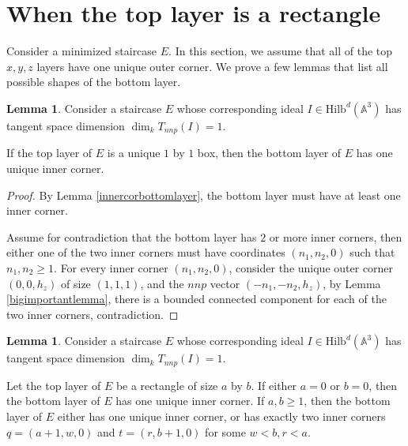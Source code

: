\documentclass{amsart}[10pt]
\theoremstyle{plain}
\theoremstyle{definition}
\newtheorem{lemma}[theorem]{Lemma}
\newcommand{\Hilb}{\mathrm{Hilb}}
\begin{document}
\section{When the top layer is a rectangle}

Consider a minimized staircase $E$. In this section, we assume that all of the top $x,y,z$ layers have one unique outer corner. We prove a few lemmas that list all possible shapes of the bottom layer.


\begin{lemma}
Consider a staircase $E$ whose corresponding ideal $I \in \Hilb^d(\mathbb{A}^3)$ has tangent space dimension $\dim_k T_{nnp}(I)=1$. 

If the top layer of $E$ is a unique $1$ by $1$ box, then the bottom layer of $E$ has one unique inner corner.
\end{lemma}

\begin{proof}
By Lemma \ref{innercorbottomlayer}, the bottom layer must have at least one inner corner.

Assume for contradiction that the bottom layer has $2$ or more inner corners, then either one of the two inner corners must have coordinates $(n_1, n_2, 0)$ such that $n_1, n_2 \geq 1$. For every inner corner $(n_1, n_2, 0)$, consider the unique outer corner $(0,0, h_z)$ of size $(1,1,1)$, and the $nnp$ vector $(-n_1, -n_2, h_z)$, by Lemma \ref{bigimportantlemma}, there is a bounded connected component for each of the two inner corners, contradiction.
\end{proof}


\begin{lemma}
\label{two_inner_corners}
Consider a staircase $E$ whose corresponding ideal $I \in \Hilb^d(\mathbb{A}^3)$ has tangent space dimension $\dim_k T_{nnp}(I)=1$. 

Let the top layer of $E$ be a rectangle of size $a$ by $b$. If either $a= 0$ or $b=0$, then the bottom layer of $E$ has one unique inner corner. If $a,b \geq 1$, then the bottom layer of $E$ either has one unique inner corner, or has exactly two inner corners $q=(a+1, w, 0)$ and $t=(r, b+1, 0)$ for some $w <b, r <a$.

\end{lemma}
\end{document}

